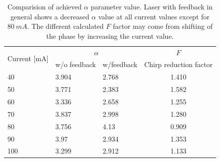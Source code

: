 \begin{table}[ht]
    \centering
    \caption{Comparision of achieved $\alpha$ parameter value. Laser with feedback in general shows a decreased $\alpha$ value at all current values except for $80 \ mA$. The different calculated $F$ factor may come from shifting of the phase by increasing the current value.}
    \label{tab:chirp_alpha_comparison}
    \begin{tabular}{@{}llll@{}}
    \toprule
    \multirow{2}{*}{Current {[}mA{]}} & \multicolumn{2}{c}{$\alpha$} & \multicolumn{1}{c}{$F$} \\
                                      & w/o feedback   & w/feedback  & Chirp reduction factor  \\ \midrule
    40                                & 3.904          & 2.768       & \multicolumn{1}{c}{1.410}                   \\
    50                                & 3.771          & 2.383       & \multicolumn{1}{c}{1.582}                   \\
    60                                & 3.336          & 2.658       & \multicolumn{1}{c}{1.255}                   \\
    70                                & 3.837          & 2.998       & \multicolumn{1}{c}{1.280}                   \\
    80                                & 3.756          & 4.13        & \multicolumn{1}{c}{0.909}                   \\
    90                                & 3.97           & 2.934       & \multicolumn{1}{c}{1.353}                   \\
    100                               & 3.299          & 2.912       & \multicolumn{1}{c}{1.133}                   \\ \bottomrule
    \end{tabular}
\end{table}

